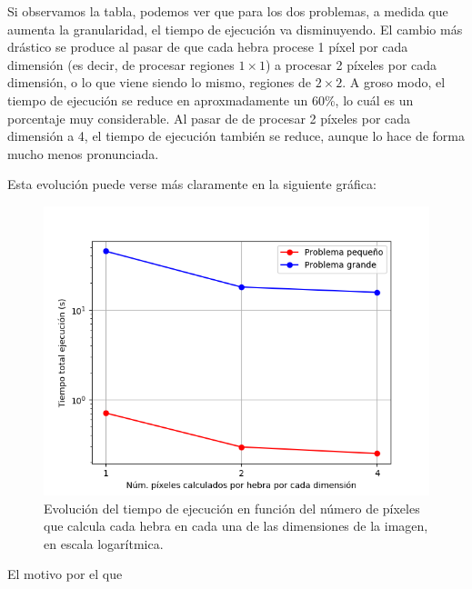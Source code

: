 \documentclass[11pt,a4paper]{article}
\begin{document}
Si observamos la tabla, podemos ver que para los dos problemas, a medida que aumenta la
granularidad, el tiempo de ejecución va disminuyendo. El cambio más drástico se produce
al pasar de que cada hebra procese 1 píxel por cada dimensión (es decir, de procesar regiones
$1 \times 1$) a procesar 2 píxeles por cada dimensión, o lo que viene siendo lo mismo, regiones
de $2 \times 2$. A groso modo, el tiempo de ejecución se reduce en aproxmadamente un 60\%, lo
cuál es un porcentaje muy considerable. Al pasar de de procesar 2 píxeles por cada dimensión a
4, el tiempo de ejecución también se reduce, aunque lo hace de forma mucho menos pronunciada.

Esta evolución puede verse más claramente en la siguiente gráfica:

\begin{figure}[H]
  \centering
  \includegraphics[scale=0.6]{img/speed}
  \caption{Evolución del tiempo de ejecución en función del número de píxeles que calcula
  cada hebra en cada una de las dimensiones de la imagen, en escala logarítmica.}
  \label{fig:time}
\end{figure}

El motivo por el que 
\end{document}
